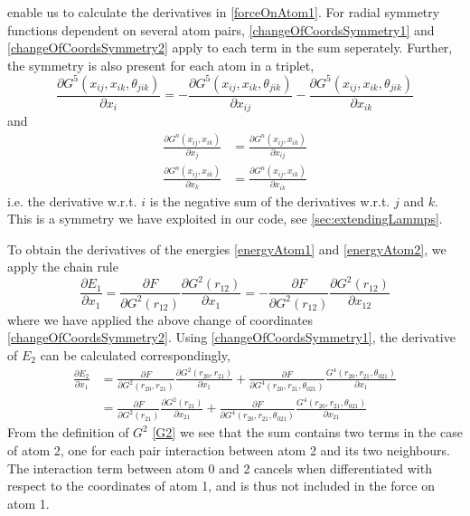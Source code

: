 \documentclass[twoside,english]{uiofysmaster}
\begin{document}
enable us to calculate the derivatives in \eqref{forceOnAtom1}. For radial symmetry functions
dependent on several atom pairs, \eqref{changeOfCoordsSymmetry1} and \eqref{changeOfCoordsSymmetry2} 
apply to each term in the sum seperately. Further, the symmetry is also present for each atom in a triplet,
\begin{equation}
 \frac{\partial G^5(x_{ij}, x_{ik}, \theta_{jik})}{\partial x_i} = 
 -\frac{\partial G^5(x_{ij}, x_{ik}, \theta_{jik})}{\partial x_{ij}} - 
 \frac{\partial G^5(x_{ij}, x_{ik}, \theta_{jik})}{\partial x_{ik}}
\end{equation}
and 
\begin{subequations}
\begin{align}
 \frac{\partial G^n(x_{ij}, x_{ik})}{\partial x_j} &= \frac{\partial G^n(x_{ij}, x_{ik})}{\partial x_{ij}} \\
 \frac{\partial G^n(x_{ij}, x_{ik})}{\partial x_k} &= \frac{\partial G^n(x_{ij}, x_{ik})}{\partial x_{ik}}
\end{align}
\end{subequations}
i.e. the derivative w.r.t. $i$ is the negative sum of the derivatives w.r.t. $j$ and $k$. This is a symmetry we
have exploited in our code, see \autoref{sec:extendingLammps}. 

To obtain the derivatives of the energies \eqref{energyAtom1} and \eqref{energyAtom2}, we apply the chain rule
\begin{equation}
 \frac{\partial E_1}{\partial x_1} = \frac{\partial F}{\partial G^2(r_{12})}
 \frac{\partial G^2(r_{12})}{\partial x_1} = 
 -\frac{\partial F}{\partial G^2(r_{12})}\frac{\partial G^2(r_{12})}{\partial x_{12}}
\end{equation}
where we have applied the above change of coordinates \eqref{changeOfCoordsSymmetry2}.
Using \eqref{changeOfCoordsSymmetry1}, the derivative of $E_2$ can be calculated correspondingly,
\begin{subequations}
\begin{align}
 \frac{\partial E_2}{\partial x_1} &= 
 \frac{\partial F}{\partial G^2(r_{20}, r_{21})}\frac{\partial G^2(r_{20}, r_{21})}{\partial x_1} + 
 \frac{\partial F}{\partial G^4(r_{20},r_{21},\theta_{021})}\frac{G^4(r_{20},r_{21},\theta_{021})}{\partial x_1} \\
 &= \frac{\partial F}{\partial G^2(r_{21})}\frac{\partial G^2(r_{21})}{\partial x_{21}} + 
 \frac{\partial F}{\partial G^4(r_{20},r_{21},\theta_{021})}\frac{G^4(r_{20},r_{21},\theta_{021})}{\partial x_{21}}
\end{align}
\end{subequations} 
From the definition of $G^2$ \eqref{G2} we see that the sum contains two terms
in the case of atom 2, one for each pair interaction between atom 2 and its two neighbours. 
The interaction term between atom 0 and 2
cancels when differentiated with respect to the coordinates of atom 1, and is thus not included in the force on atom 1. 
 
\end{document}
